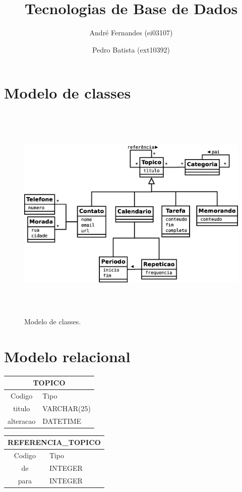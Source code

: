 \documentclass[a4paper,12pt]{article}
\title{Tecnologias de Base de Dados}
\author{André Fernandes (ei03107) \and Pedro Batista (ext10392)}
\begin{document}
\maketitle

\section{Modelo de classes}

	\begin{figure}[htp]
		\begin{center}
			\includegraphics[height=300pt]{uml}
		\end{center}
		\caption{Modelo de classes.}
		\label{fig:uml}
	\end{figure}

\section{Modelo relacional}
	
	\begin{tabular}{|c|l|} \hline
		\multicolumn{2}{|c|}{TOPICO} \\ \hline
		Codigo & Tipo \\ \hline
		titulo & VARCHAR(25) \\
		alteracao & DATETIME \\ \hline 
		\end{tabular}
	
	\begin{tabular}{|c|l|} \hline
		\multicolumn{2}{|c|}{REFERENCIA\_TOPICO} \\ \hline
		Codigo & Tipo \\ \hline
		de & INTEGER \\
		para & INTEGER \\ \hline
		\end{tabular}
	
\end{document}
